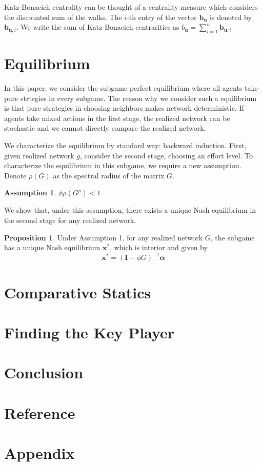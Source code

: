 \documentclass[12pt]{article}
\theoremstyle{definition}
\newtheorem{proposition}{Proposition}
\newtheorem{assumption}{Assumption}
\newcommand{\bs}[1]{\boldsymbol{#1}}
\begin{document}
Katz-Bonacich centrality can be thought of a centrality measure which considers the discounted sum of the walks.
The $i$-th entry of the vector $\bs{b}_{\bs{u}}$ is denoted by $\bs{b}_{\bs{u}, i}$.
We write the sum of Katz-Bonacich centrarities as $b_{\bs{u}} = \sum_{i=1}^n \bs{b}_{\bs{u}, i}$


\section{Equilibrium}

In this paper, we consider the subgame perfect equilibrium where all agents take pure strtegies in every subgame.
The reason why we consider such a equilibrium is that pure strategies in choosing neighbors makes network deterministic.
If agents take mixed actions in the first stage, the realized network can be stochastic and we cannot directly compare the realized network.

We characterize the equilibrium by standard way: backward induction.
First, given realized network $g$, consider the second stage, choosing an effort level.
To characterize the equilibrium in this subgame, we require a new assumption.
Denote $\rho (G)$ as the spectral radius of the matrix $G$.

\begin{assumption}
$\phi \rho(G^p) < 1$
\end{assumption}

We show that, under this assumption, there exists a unique Nash equilibrium in the second stage for any realized network.

\begin{proposition}
Under Assumption 1, for any realized network $G$, the subgame has a unique Nash equilibrium $\bs{x}^*$, which is interior and given by
\[ \bs{x}^* = {(\bs{I} - \phi G)}^{-1} \bs{\alpha} \]
\end{proposition}


\section{Comparative Statics}


\section{Finding the Key Player}


\section{Conclusion}


\section{Reference}


\section{Appendix}
\end{document}
